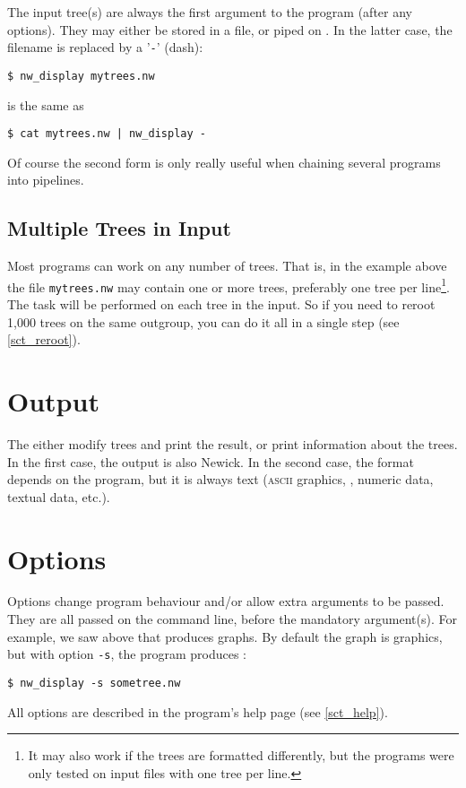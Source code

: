 The input tree(s) are always the first argument to the program (after any options). They may either be stored in a file, or piped on \stdin{}. In the latter case, the filename is replaced by a '\texttt{-}' (dash):

\begin{samepage}
\begin{verbatim}
$ nw_display mytrees.nw
\end{verbatim}
is the same as
\begin{verbatim}
$ cat mytrees.nw | nw_display -
\end{verbatim}
\end{samepage}
Of course the second form is only really useful when chaining several programs into pipelines.

\subsection{Multiple Trees in Input}

Most programs can work on any number of trees. That is, in the example above
the file \texttt{mytrees.nw} may contain one or more trees, preferably one tree
per line\footnote{It may also work if the trees are formatted differently, but
the programs were only tested on input files with one tree per line.}. The
task will be performed on each tree in the input. So if you need to reroot
1,000 trees on the same outgroup, you can do it all in a single step (see
\ref{sct_reroot}).

\section{Output}
\label{sct_output}

The \nutils{} either modify trees and print the result, or print information about the trees. In the first case, the output is also Newick. In the second case, the format depends on the program, but it is always text (\textsc{ascii} graphics, \svg, numeric data, textual data, etc.).

\section{Options}
\label{sct_options}

Options change program behaviour and/or allow extra arguments to be passed.
They are all passed on the command line, before the mandatory argument(s). For
example, we saw above that \display{} produces graphs. By default the graph is \ascii{} graphics, but with option \texttt{-s}, the program produces \svg:
\begin{verbatim}
$ nw_display -s sometree.nw
\end{verbatim}
All options are described in the program's help page (see \ref{sct_help}).
